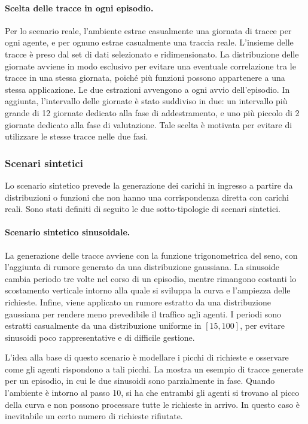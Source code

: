 \paragraph{Scelta delle tracce in ogni episodio.} Per lo scenario reale, l'ambiente estrae casualmente una giornata di tracce per ogni agente, e per ognuno estrae casualmente una traccia reale. L'insieme delle tracce è preso dal set di dati selezionato e ridimensionato. La distribuzione delle giornate avviene in modo esclusivo per evitare una eventuale correlazione tra le tracce in una stessa giornata, poiché più funzioni possono appartenere a una stessa applicazione. Le due estrazioni avvengono a ogni avvio dell'episodio. In aggiunta, l'intervallo delle giornate è stato suddiviso in due: un intervallo più grande di 12 giornate dedicato alla fase di addestramento, e uno più piccolo di 2 giornate dedicato alla fase di valutazione. Tale scelta è motivata per evitare di utilizzare le stesse tracce nelle due fasi.

\subsubsection{Scenari sintetici}

Lo scenario sintetico prevede la generazione dei carichi in ingresso a partire da distribuzioni o funzioni che non hanno una corrispondenza diretta con carichi reali. Sono stati definiti di seguito le due sotto-tipologie di scenari sintetici.

\paragraph{Scenario sintetico sinusoidale.} La generazione delle tracce avviene con la funzione trigonometrica del seno, con l'aggiunta di rumore generato da una distribuzione gaussiana. La sinusoide cambia periodo tre volte nel corso di un episodio, mentre rimangono costanti lo scostamento verticale intorno alla quale si sviluppa la curva e l'ampiezza delle richieste. Infine, viene applicato un rumore estratto da una distribuzione gaussiana per rendere meno prevedibile il traffico agli agenti. I periodi sono estratti casualmente da una distribuzione uniforme in $[15, 100]$, per evitare sinusoidi poco rappresentative e di difficile gestione.

L'idea alla base di questo scenario è modellare i picchi di richieste e osservare come gli agenti rispondono a tali picchi. La  mostra un esempio di tracce generate per un episodio, in cui le due sinusoidi sono parzialmente in fase. Quando l'ambiente è intorno al passo 10, si ha che entrambi gli agenti si trovano al picco della curva e non possono processare tutte le richieste in arrivo. In questo caso è inevitabile un certo numero di richieste rifiutate.

